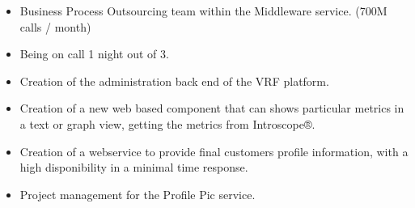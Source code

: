 \documentclass[10pt,a4paper]{altacv}
\begin{document}
\divider

\begin{itemize}
\item Business Process Outsourcing team within the Middleware service. (700M calls / month)
\item Being on call 1 night out of 3.
\end{itemize}
\divider

\begin{itemize}
\item Creation of the administration back end of the VRF platform.
\end{itemize}
\divider

\begin{itemize}
\item Creation of a new web based component that can shows particular metrics in a text or graph view, getting the metrics from Introscope®.
\end{itemize}
\divider

\begin{itemize}
\item Creation of a webservice to provide final customers profile information, with a high disponibility in a minimal time response.
\item Project management for the Profile Pic service.
\end{itemize}


\end{document}
